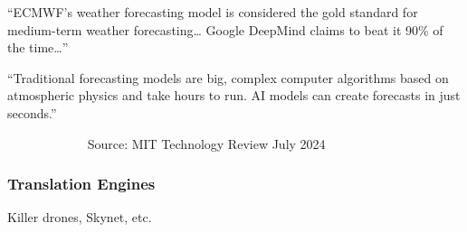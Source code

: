 \begin{frame}

    
    ``ECMWF's weather forecasting model is considered the gold standard for
        medium-term weather forecasting\ldots 
        Google DeepMind claims to beat it 90\% of the time\ldots''

    \vspace{0.5em}
    \vspace{0.5em}

    ``Traditional forecasting models are big, complex computer algorithms based
    on atmospheric physics and take hours to run. AI models can create forecasts
    in just seconds.'' 
    \vspace{0.5em}
    \vspace{0.5em}

    $\quad \qquad$$\quad \qquad$ Source: MIT Technology Review  July 2024



\end{frame}



\begin{frame}
    \frametitle{Translation Engines}
    
    \begin{figure}
       \centering
    \end{figure}

\end{frame}


\begin{frame}{Killer drones, Skynet, etc.}

    \begin{figure}
       \centering
    \end{figure}

\end{frame}

